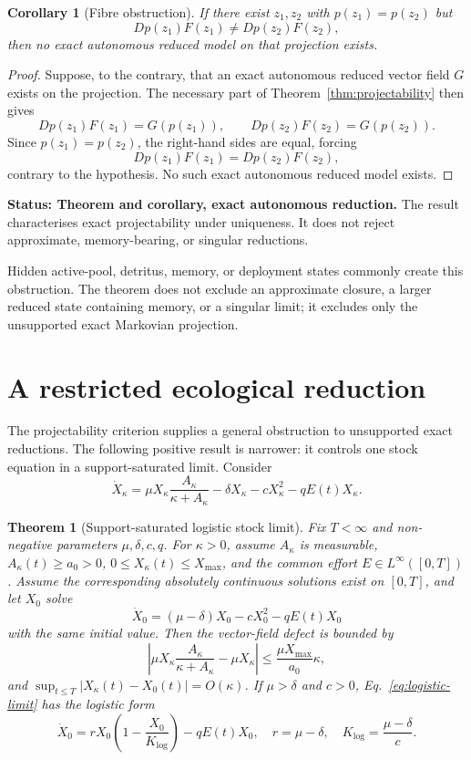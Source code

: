 \documentclass[11pt]{article}
\newtheorem{theorem}{Theorem}
\newtheorem{corollary}{Corollary}
\theoremstyle{definition}
\newcommand{\status}[1]{\par\smallskip\noindent\textbf{Status: #1.}\quad}
\begin{document}
\begin{corollary}[Fibre obstruction]
If there exist $z_1,z_2$ with $p(z_1)=p(z_2)$ but
\[
Dp(z_1)F(z_1)\ne Dp(z_2)F(z_2),
\]
then no exact autonomous reduced model on that projection exists.
\end{corollary}

\begin{proof}
Suppose, to the contrary, that an exact autonomous reduced vector field $G$ exists on the projection. The necessary part of Theorem~\ref{thm:projectability} then gives
\[
Dp(z_1)F(z_1)=G(p(z_1)),
\qquad
Dp(z_2)F(z_2)=G(p(z_2)).
\]
Since $p(z_1)=p(z_2)$, the right-hand sides are equal, forcing
\[
Dp(z_1)F(z_1)=Dp(z_2)F(z_2),
\]
contrary to the hypothesis. No such exact autonomous reduced model exists.
\end{proof}

\status{Theorem and corollary, exact autonomous reduction} The result characterises exact projectability under uniqueness. It does not reject approximate, memory-bearing, or singular reductions.

Hidden active-pool, detritus, memory, or deployment states commonly create this obstruction. The theorem does not exclude an approximate closure, a larger reduced state containing memory, or a singular limit; it excludes only the unsupported exact Markovian projection.

\section{A restricted ecological reduction}

The projectability criterion supplies a general obstruction to unsupported exact reductions. The following positive result is narrower: it controls one stock equation in a support-saturated limit. Consider
\begin{equation}
\dot X_\kappa
=\mu X_\kappa\frac{A_\kappa}{\kappa+A_\kappa}
-\delta X_\kappa-cX_\kappa^2-qE(t)X_\kappa.
\label{eq:support-stock}
\end{equation}

\begin{theorem}[Support-saturated logistic stock limit]
\label{thm:logistic}
Fix $T<\infty$ and non-negative parameters $\mu,\delta,c,q$. For $\kappa>0$, assume $A_\kappa$ is measurable, $A_\kappa(t)\ge a_0>0$, $0\le X_\kappa(t)\le X_{\max}$, and the common effort $E\in L^\infty([0,T])$. Assume the corresponding absolutely continuous solutions exist on $[0,T]$, and let $X_0$ solve
\begin{equation}
\dot X_0=(\mu-\delta)X_0-cX_0^2-qE(t)X_0
\label{eq:logistic-limit}
\end{equation}
with the same initial value. Then the vector-field defect is bounded by
\[
\left|\mu X_\kappa\frac{A_\kappa}{\kappa+A_\kappa}-\mu X_\kappa\right|
\le\frac{\mu X_{\max}}{a_0}\kappa,
\]
and $\sup_{t\le T}|X_\kappa(t)-X_0(t)|=O(\kappa)$. If $\mu>\delta$ and $c>0$, Eq.~\eqref{eq:logistic-limit} has the logistic form
\[
\dot X_0=rX_0\left(1-\frac{X_0}{K_{\log}}\right)-qE(t)X_0,
\quad r=\mu-\delta,
\quad K_{\log}=\frac{\mu-\delta}{c}.
\]
\end{theorem}
\end{document}
